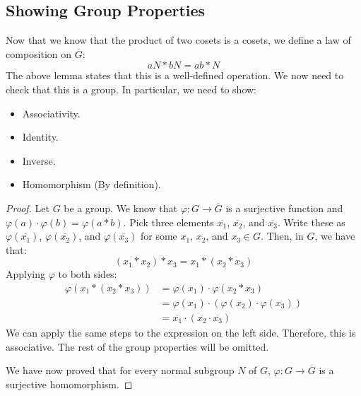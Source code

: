 \documentclass[letterpaper]{article}
\begin{document}
\subsection{Showing Group Properties}
Now that we know that the product of two cosets is a cosets, we define a law of composition on $\overline{G}$: 
\[aN * bN = ab * N\]
The above lemma states that this is a well-defined operation. We now need to check that this is a group. In particular, we need to show: 
\begin{itemize}
    \item Associativity.
    \item Identity. 
    \item Inverse. 
    \item Homomorphism (By definition).
\end{itemize}
\begin{mdframed}
    \begin{proof}
        Let $G$ be a group. We know that $\varphi: G \to \overline{G}$ is a surjective function and $\varphi(a) \cdot \varphi(b) = \varphi(a * b)$. Pick three elements $\overline{x_1}$, $\overline{x_2}$, and $\overline{x_3}$. Write these as $\varphi(\overline{x_1})$, $\varphi(\overline{x_2})$, and $\varphi(\overline{x_3})$ for some $x_1$, $x_2$, and $x_3 \in G$. Then, in $G$, we have that: 
        \[(x_1 * x_2) * x_3 = x_1 * (x_2 * x_3)\]
        Applying $\varphi$ to both sides: 
        \begin{equation*}
            \begin{aligned}
                \varphi(x_1 * (x_2 * x_3)) &= \varphi(x_1) \cdot \varphi(x_2 * x_3) \\ 
                    &= \varphi(x_1) \cdot (\varphi(x_2) \cdot \varphi(x_3)) \\ 
                    &= \overline{x_1} \cdot (\overline{x_2} \cdot \overline{x_3})
            \end{aligned}
        \end{equation*}
        We can apply the same steps to the expression on the left side. Therefore, this is associative. The rest of the group properties will be omitted. 

        \bigskip 

        We have now proved that for every normal subgroup $N$ of $G$, $\varphi: G \to \overline{G}$ is a surjective homomorphism. 
    \end{proof}
\end{mdframed}
\end{document}
